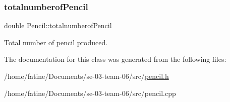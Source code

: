 \subsubsection{\texorpdfstring{totalnumberof\+Pencil}{totalnumberofPencil}}
{\footnotesize\ttfamily double Pencil\+::totalnumberof\+Pencil}

Total number of pencil produced. 

The documentation for this class was generated from the following files\+:\begin{DoxyCompactItemize}
\item 
/home/fatine/\+Documents/se-\/03-\/team-\/06/src/\hyperlink{pencil_8h}{pencil.\+h}\item 
/home/fatine/\+Documents/se-\/03-\/team-\/06/src/pencil.\+cpp\end{DoxyCompactItemize}
